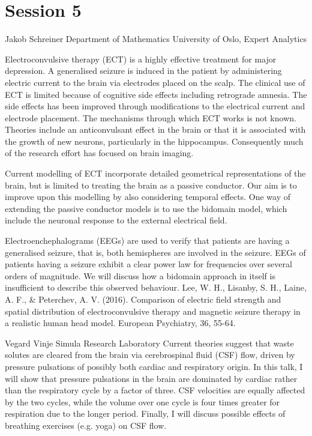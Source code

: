 \documentclass{article}
\begin{document}
\newpage
\section*{Session 5}

{Jakob Schreiner}
{Department of Mathematics University of Oslo, Expert Analytics}
{Electroconvulsive therapy (ECT) is a highly effective treatment for major depression. A
generalised seizure is induced in the patient by administering electric current to the
brain via electrodes placed on the scalp. The clinical use of ECT is limited because of
cognitive side effects including retrograde amnesia. The side effects has been improved
through modifications to the electrical current and electrode placement. The mechanisms
through which ECT works is not known. Theories include an anticonvulsant effect in the
brain or that it is associated with the growth of new neurons, particularly in the
hippocampus. Consequently much of the research effort has focused on brain imaging.

Current modelling of ECT incorporate detailed geometrical representations of the brain,
but is limited to treating the brain as a passive conductor. Our aim is to improve upon
this modelling by also considering temporal effects. One way of extending the passive
conductor models is to use the bidomain model, which include the neuronal response to the
external electrical field.

Electroenchephalograms (EEGs) are used to verify that patients are having a generalised
seizure, that is, both hemispheres are involved in the seizure. EEGs of patients having
a seizure exhibit a clear power law for frequencies over several orders of magnitude. We
will discuss how a bidomain approach in itself is insufficient to describe this observed
behaviour. \newline\newline
\small{Lee, W. H., Lisanby, S. H., Laine, A. F., \& Peterchev, A. V. (2016). Comparison of
electric field strength and spatial distribution of electroconvulsive therapy and magnetic
seizure therapy in a realistic human head model. European Psychiatry, 36, 55-64.}}
{Vegard Vinje}
{Simula Research Laboratory}
{Current theories suggest that waste solutes are cleared from the brain
via cerebrospinal fluid (CSF) flow, driven by pressure pulsations of
possibly both cardiac and respiratory origin. In this talk, I will show
that pressure pulsations in the brain are dominated by cardiac rather
than the respiratory cycle by a factor of three. CSF velocities are
equally affected by the two cycles, while the volume over one cycle is
four times greater for respiration due to the longer period. Finally, I
will discuss possible effects of breathing exercises (e.g. yoga) on CSF
flow.}
\end{document}
